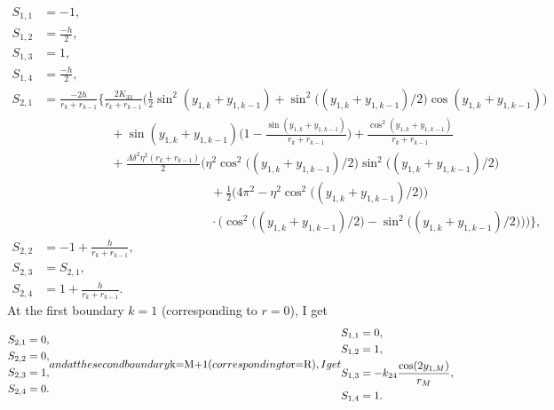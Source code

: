 \documentclass[12pt]{article}
\begin{document}
\begin{subequations}
\begin{align}
S_{1,1}&=-1,\\
S_{1,2}&=\frac{-h}{2},\\
S_{1,3}&=1,\\
S_{1,4}&=\frac{-h}{2},\\
S_{2,1}&=\frac{-2h}{r_k+r_{k-1}}\bigg\{\frac{2K_{33}}{r_k+r_{k-1}}\bigg(\frac{1}{2}\sin^2(y_{1,k}+y_{1,k-1})+\sin^2\big((y_{1,k}+y_{1,k-1})/2\big)\cos(y_{1,k}+y_{1,k-1})\bigg)\nonumber\\
&\phantom{=\frac{-2h}{r_k+r_{k-1}}\bigg\{\}}+\sin(y_{1,k}+y_{1,k-1})\bigg(1-\frac{\sin(y_{1,k}+y_{1,k-1})}{r_k+r_{k-1}}\bigg)+\frac{\cos^2(y_{1,k}+y_{1,k-1})}{r_k+r_{k-1}}\nonumber\\
&\phantom{=\frac{-2h}{r_k+r_{k-1}}\bigg\{\}}+\frac{\Lambda\delta^2\eta^2(r_k+r_{k-1})}{2}\bigg(\eta^2\cos^2\big((y_{1,k}+y_{1,k-1})/2\big)\sin^2\big((y_{1,k}+y_{1,k-1})/2\big)\nonumber\\
&\phantom{=\frac{-2h}{r_k+r_{k-1}}\bigg\{\}+\frac{\Lambda\delta^2\eta^2(r_k+r_{k-1})}{2}\bigg()}+\frac{1}{2}\big(4\pi^2-\eta^2\cos^2\big((y_{1,k}+y_{1,k-1})/2\big)\big)\nonumber\\
&\phantom{=\frac{-2h}{r_k+r_{k-1}}\bigg\{\}+\frac{\Lambda\delta^2\eta^2(r_k+r_{k-1})}{2}\bigg()}\cdot\big(\cos^2\big((y_{1,k}+y_{1,k-1})/2\big)-\sin^2\big((y_{1,k}+y_{1,k-1})/2\big)\big)\bigg)\bigg\},\\
S_{2,2}&=-1+\frac{h}{r_k+r_{k-1}},\\
S_{2,3}&=S_{2,1},\\
S_{2,4}&=1+\frac{h}{r_k+r_{k-1}}.
\end{align}
\end{subequations}
At the first boundary $k=1$ (corresponding to $r=0$), I get
\begin{subequations}
\begin{align}
S_{2,1}&=0,\\
S_{2,2}&=0,\\
S_{2,3}&=1,\\
S_{2,4}&=0.
\end{align}
and at the second boundary $k=M+1$ (corresponding to $r=R$), I get
\begin{align}
S_{1,1}&=0,\\
S_{1,2}&=1,\\
S_{1,3}&=-k_{24}\frac{\cos(2y_{1,M})}{r_M},\\
S_{1,4}&=1.
\end{align}
\end{subequations}

\clearpage


\end{document}
